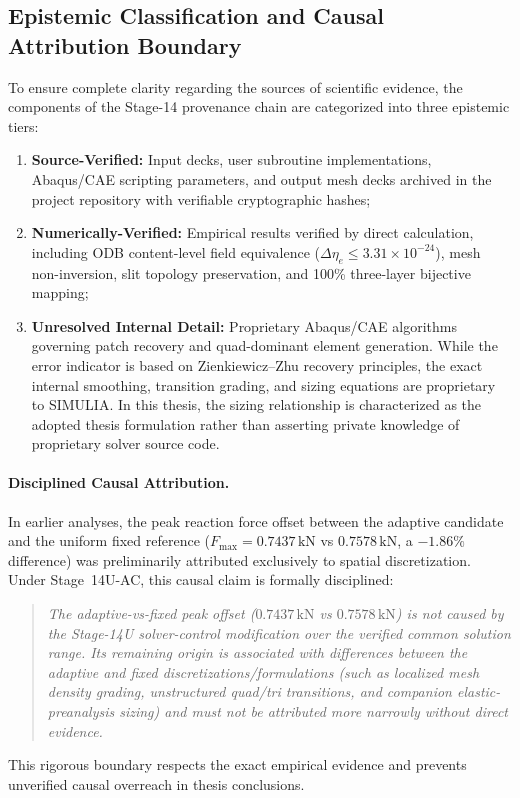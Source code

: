 \subsection{Epistemic Classification and Causal Attribution Boundary}
\label{subsec:stage14uac_epistemic_causal}

To ensure complete clarity regarding the sources of scientific evidence, the components of the Stage-14 provenance chain are categorized into three epistemic tiers:
\begin{enumerate}
  \item \textbf{Source-Verified:} Input decks, user subroutine implementations, Abaqus/CAE scripting parameters, and output mesh decks archived in the project repository with verifiable cryptographic hashes;
  \item \textbf{Numerically-Verified:} Empirical results verified by direct calculation, including ODB content-level field equivalence ($\Delta\eta_e \le 3.31 \times 10^{-24}$), mesh non-inversion, slit topology preservation, and 100\% three-layer bijective mapping;
  \item \textbf{Unresolved Internal Detail:} Proprietary Abaqus/CAE algorithms governing patch recovery and quad-dominant element generation. While the error indicator is based on Zienkiewicz--Zhu recovery principles, the exact internal smoothing, transition grading, and sizing equations are proprietary to SIMULIA. In this thesis, the sizing relationship is characterized as the adopted thesis formulation rather than asserting private knowledge of proprietary solver source code.
\end{enumerate}

\paragraph{Disciplined Causal Attribution.}
In earlier analyses, the peak reaction force offset between the adaptive candidate and the uniform fixed reference ($F_{\max} = 0.7437\,\mathrm{kN}$ vs $0.7578\,\mathrm{kN}$, a $-1.86\%$ difference) was preliminarily attributed exclusively to spatial discretization. Under Stage~14U-AC, this causal claim is formally disciplined:
\begin{quote}
  \itshape
  The adaptive-vs-fixed peak offset ($0.7437\,\mathrm{kN}$ vs $0.7578\,\mathrm{kN}$) is not caused by the Stage-14U solver-control modification over the verified common solution range. Its remaining origin is associated with differences between the adaptive and fixed discretizations/formulations (such as localized mesh density grading, unstructured quad/tri transitions, and companion elastic-preanalysis sizing) and must not be attributed more narrowly without direct evidence.
\end{quote}
This rigorous boundary respects the exact empirical evidence and prevents unverified causal overreach in thesis conclusions.




